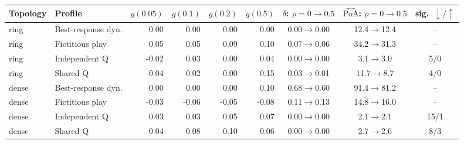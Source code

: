\begin{tabular}{llrrrrccc}
\toprule
Topology & Profile & $g(0.05)$ & $g(0.1)$ & $g(0.2)$ & $g(0.5)$ & $\delta$: $\rho{=}0\to0.5$ & $\widehat{\mathrm{PoA}}$: $\rho{=}0\to0.5$ & sig.\ $\downarrow/\uparrow$ \\
\midrule
ring & Best-response dyn. & 0.00 & 0.00 & 0.00 & 0.00 & 0.00$\to$0.00 & 12.4$\to$12.4 & -- \\
ring & Fictitious play & 0.05 & 0.05 & 0.09 & 0.10 & 0.07$\to$0.06 & 34.2$\to$31.3 & -- \\
ring & Independent Q & -0.02 & 0.03 & 0.00 & 0.04 & 0.00$\to$0.00 & 3.1$\to$3.0 & 5/0 \\
ring & Shared Q & 0.04 & 0.02 & 0.00 & 0.15 & 0.03$\to$0.01 & 11.7$\to$8.7 & 4/0 \\
dense & Best-response dyn. & 0.00 & 0.00 & 0.00 & 0.10 & 0.68$\to$0.60 & 91.4$\to$81.2 & -- \\
dense & Fictitious play & -0.03 & -0.06 & -0.05 & -0.08 & 0.11$\to$0.13 & 14.8$\to$16.0 & -- \\
dense & Independent Q & 0.03 & 0.03 & 0.05 & 0.07 & 0.00$\to$0.00 & 2.1$\to$2.1 & 15/1 \\
dense & Shared Q & 0.04 & 0.08 & 0.10 & 0.06 & 0.00$\to$0.00 & 2.7$\to$2.6 & 8/3 \\
\bottomrule
\end{tabular}
